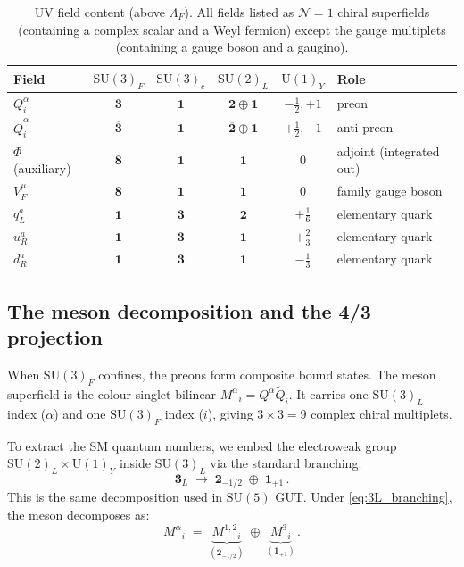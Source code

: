\documentclass[12pt,a4paper]{article}
\newcommand{\SU}{\mathrm{SU}}
\newcommand{\UU}{\mathrm{U}}
\begin{document}
\begin{table}[ht]
\centering\small
\caption{UV field content (above $\Lambda_F$).
  All fields listed as $\mathcal{N}{=}1$ chiral superfields
  (containing a complex scalar and a Weyl fermion) except the
  gauge multiplets (containing a gauge boson and a gaugino).}
\label{tab:UV_fields}
\begin{tabular}{lccccl}
\hline
Field & $\SU(3)_F$ & $\SU(3)_c$ & $\SU(2)_L$ & $\UU(1)_Y$ & Role \\
\hline
$Q^\alpha_i$ & $\mathbf{3}$ & $\mathbf{1}$ & $\mathbf{2}\oplus\mathbf{1}$ & $-\tfrac{1}{2},+1$ & preon \\
$\tilde{Q}_i^\alpha$ & $\overline{\mathbf{3}}$ & $\mathbf{1}$ & $\overline{\mathbf{2}}\oplus\mathbf{1}$ & $+\tfrac{1}{2},-1$ & anti-preon \\
$\Phi$ (auxiliary) & $\mathbf{8}$ & $\mathbf{1}$ & $\mathbf{1}$ & $0$ & adjoint (integrated out) \\
$V_F^\mu$ & $\mathbf{8}$ & $\mathbf{1}$ & $\mathbf{1}$ & $0$ & family gauge boson \\
$q_L^a$ & $\mathbf{1}$ & $\mathbf{3}$ & $\mathbf{2}$ & $+\tfrac{1}{6}$ & elementary quark \\
$u_R^a$ & $\mathbf{1}$ & $\mathbf{3}$ & $\mathbf{1}$ & $+\tfrac{2}{3}$ & elementary quark \\
$d_R^a$ & $\mathbf{1}$ & $\mathbf{3}$ & $\mathbf{1}$ & $-\tfrac{1}{3}$ & elementary quark \\
\hline
\end{tabular}
\end{table}


\subsection{The meson decomposition and the 4/3 projection}

When $\SU(3)_F$ confines, the preons form composite bound states.
The meson superfield is the colour-singlet bilinear
$M^\alpha{}_i = Q^\alpha\tilde{Q}_i$.
It carries one $\SU(3)_L$ index ($\alpha$) and one
$\SU(3)_F$ index ($i$), giving $3 \times 3 = 9$ complex
chiral multiplets.

To extract the SM quantum numbers, we embed the electroweak
group $\SU(2)_L \times \UU(1)_Y$ inside $\SU(3)_L$ via the
standard branching:
\begin{equation}
  \mathbf{3}_L \;\to\;
  \mathbf{2}_{-1/2} \;\oplus\; \mathbf{1}_{+1}\,.
  \label{eq:3L_branching}
\end{equation}
This is the same decomposition used in $\SU(5)$ GUT.
Under \eqref{eq:3L_branching}, the meson decomposes as:
\begin{equation}
  M^\alpha{}_i \;=\;
  \underbrace{M^{1,2}{}_i}_{(\mathbf{2}_{-1/2})}
  \;\oplus\;
  \underbrace{M^{3}{}_i}_{(\mathbf{1}_{+1})}\,.
  \label{eq:meson_decomp}
\end{equation}
\end{document}
